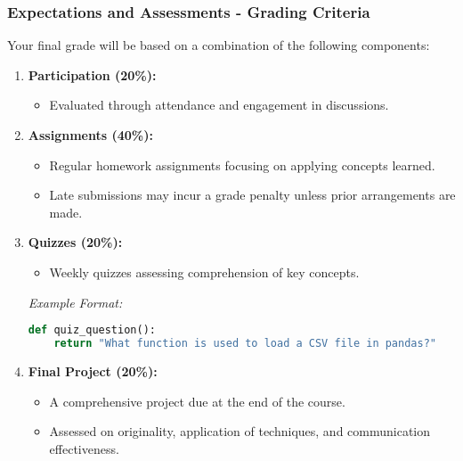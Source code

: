 \documentclass[aspectratio=169]{beamer}
\begin{document}
\begin{frame}[fragile]
  \frametitle{Expectations and Assessments - Grading Criteria}
  
  Your final grade will be based on a combination of the following components:

  \begin{enumerate}
    \item \textbf{Participation (20\%):}
      \begin{itemize}
        \item Evaluated through attendance and engagement in discussions.
      \end{itemize}

    \item \textbf{Assignments (40\%):}
      \begin{itemize}
        \item Regular homework assignments focusing on applying concepts learned.
        \item Late submissions may incur a grade penalty unless prior arrangements are made.
      \end{itemize}

    \item \textbf{Quizzes (20\%):}
      \begin{itemize}
        \item Weekly quizzes assessing comprehension of key concepts.
      \end{itemize}
      \textit{Example Format:}
      \begin{lstlisting}[language=Python]
def quiz_question():
    return "What function is used to load a CSV file in pandas?"
      \end{lstlisting}

    \item \textbf{Final Project (20\%):}
      \begin{itemize}
        \item A comprehensive project due at the end of the course.
        \item Assessed on originality, application of techniques, and communication effectiveness.
      \end{itemize}
  \end{enumerate}
\end{frame}
\end{document}
